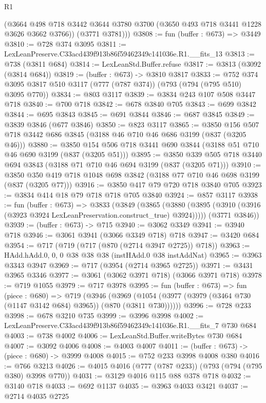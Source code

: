 \begin{lexlean}{R1}
\begin{coremodule}
        (@3664 @498 @718 @3442 @3644 @3780 @3700 (@3650 @493 @718 @3441 @1228 @3626 @3662 @3766))
        (@3771 @3781)))
@3808 := fun (buffer : @673) => @3449
@3810 := @728 @374 @3095
@3811 := LexLeanPreserve.C33acd439f913b86f59462349c141036e.R1.__fits_13
@3813 := @738 (@3811 @684)
@3814 := LexLeanStd.Buffer.refuse
@3817 := @3813 (@3092 (@3814 @684))
@3819 := (buffer : @673) -> @3810 @3817
@3833 := @752 @374 @3095 @3817 @510 @3117 (@777 (@787 @374)) (@793 (@794 (@795 @510) @3095 @770))
@3834 := @803 @3117
@3839 := @3834 @243 @107 @508 @3447 @718
@3840 := @700 @718
@3842 := @678 @3840 @705
@3843 := @699 @3842
@3844 := @695 @3843
@3845 := @691 @3844
@3846 := @687 @3845
@3849 := @3839 @3846 (@677 @3846)
@3850 := @823 @3117
@3865 := @3850 @156 @507 @718 @3442 @686 @3845 (@3188 @46 @710 @46 @686 @3199 (@837 (@3205 @46)))
@3880 := @3850 @154 @506 @718 @3441 @690 @3844 (@3188 @51 @710 @46 @690 @3199 (@837 (@3205 @51)))
@3895 := @3850 @339 @505 @718 @3440 @694 @3843 (@3188 @71 @710 @46 @694 @3199 (@837 (@3205 @71)))
@3910 := @3850 @350 @419 @718 @1048 @698 @3842 (@3188 @77 @710 @46 @698 @3199 (@837 (@3205 @77)))
@3916 := @3850 @417 @79 @720 @718 @3840 @705
@3923 := @3834 @414 @18 @79 @718 @718 @705 @3840
@3924 := @857 @3117
@3938 := fun (buffer : @673) =>
  @3833
    (@3849
      (@3865 (@3880 (@3895 (@3910 (@3916 (@3923 @3924 LexLeanPreservation.construct_true) @3924)))))
      (@3771 @3846))
@3939 := (buffer : @673) -> @715
@3940 := @3062 @3349
@3941 := @3940 @718
@3946 := @3061 @3941 (@3066 @3349 @718) @718
@3947 := @3420 @684
@3954 := @717 (@719 (@717 (@870 (@2714 @3947 @2725)) @718))
@3963 := HAdd.hAdd.{0, 0, 0} @38 @38 @38 (instHAdd.{0} @38 instAddNat)
@3965 := @3963 @3343 @3947
@3969 := @717 (@3954 (@2714 @3965 @2725))
@3971 := @3431 @3965 @3346
@3977 := @3061 (@3062 @3971 @718) (@3066 @3971 @718)
@3978 := @719 @1055
@3979 := @717 @3978
@3995 := fun (buffer : @673) =>
  fun (piece : @680) =>
  @719
    (@3946
      (@3969 (@1054 (@3977 (@3979 (@3464 @730 (@1147 @3142 @684) @3965)) (@870 (@3811 @730))))))
@3996 := @728 @233
@3998 := @678 @3210 @735
@3999 := @3996 @3998
@4002 := LexLeanPreserve.C33acd439f913b86f59462349c141036e.R1.__fits_7 @730 @684
@4003 := @738 @4002
@4006 := LexLeanStd.Buffer.writeBytes @730 @684
@4007 := @3092 @4006
@4008 := @4003 @4007
@4011 := (buffer : @673) -> (piece : @680) -> @3999 @4008
@4015 := @752 @233 @3998 @4008 @380
@4016 := @766 @3213
@4026 := @4015 @4016 (@777 (@787 @233)) (@793 (@794 (@795 @380) @3998 @770))
@4031 := @3129 @4016 @115 @88 @378 @718
@4032 := @3140 @718
@4033 := @692 @1137
@4035 := @3963 @4033 @3421
@4037 := @2714 @4035 @2725

\end{coremodule}
\end{lexlean}
